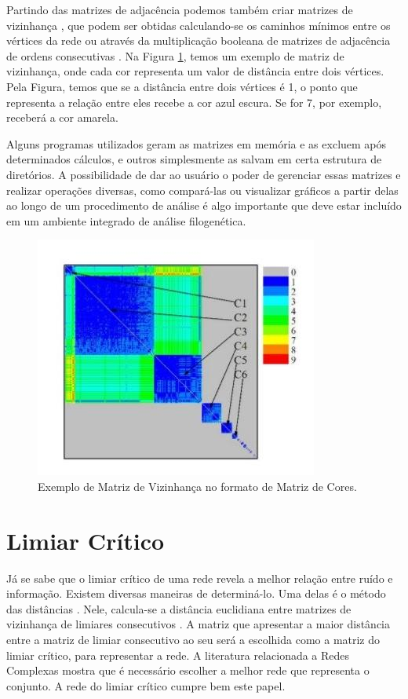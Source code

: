 Partindo das matrizes de adjacência podemos também criar matrizes de vizinhança \cite{andrade2009}, que podem ser obtidas calculando-se os caminhos mínimos
\cite{bessa2008} entre os vértices da rede ou através da multiplicação booleana de matrizes de adjacência de ordens consecutivas \cite{andrade2006}. Na Figura 
\ref{fig:matriz-vizinhanca}, temos um exemplo de matriz de vizinhança, onde cada cor representa um valor de distância entre dois vértices. Pela Figura, temos
que se a distância entre dois vértices é 1, o ponto que representa a relação entre eles recebe a cor azul escura. Se for 7, por exemplo, receberá a cor
amarela.

Alguns programas utilizados geram as matrizes em memória e as excluem após determinados cálculos, e outros simplesmente as salvam em certa estrutura
de diretórios. A possibilidade de dar ao usuário o poder de gerenciar essas matrizes e realizar operações diversas, como compará-las ou visualizar gráficos
a partir delas ao longo de um procedimento de análise é algo importante que deve estar incluído em um ambiente integrado de análise filogenética.

\begin{figure}
\centering
\includegraphics[scale=0.53]{matriz-vizinhanca}
\caption{Exemplo de Matriz de Vizinhança no formato de Matriz de Cores.}
\label{fig:matriz-vizinhanca}
\end{figure}

\section{Limiar Crítico} \label{sec:limcrit}

Já se sabe que o limiar crítico de uma rede revela a melhor relação entre ruído e informação. Existem diversas maneiras de determiná-lo.
Uma delas é o método das distâncias \cite{andrade2009}. Nele, calcula-se a distância euclidiana entre matrizes de
vizinhança de limiares consecutivos \cite{andrade2011}. A matriz que apresentar a maior distância entre a matriz de limiar consecutivo
ao seu será a escolhida como a matriz do limiar crítico, para representar a rede. A literatura relacionada a Redes Complexas mostra que é necessário
escolher a melhor rede que representa o conjunto.
A rede do limiar crítico cumpre bem este papel.

